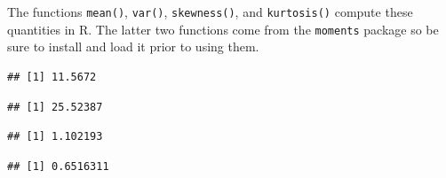 \documentclass[
]{book}
\newenvironment{Shaded}{\begin{snugshade}}{\end{snugshade}}
\newcommand{\DecValTok}[1]{\textcolor[rgb]{0.00,0.00,0.81}{#1}}
\newcommand{\DocumentationTok}[1]{\textcolor[rgb]{0.56,0.35,0.01}{\textbf{\textit{#1}}}}
\newcommand{\FunctionTok}[1]{\textcolor[rgb]{0.13,0.29,0.53}{\textbf{#1}}}
\newcommand{\NormalTok}[1]{#1}
\newcommand{\SpecialCharTok}[1]{\textcolor[rgb]{0.81,0.36,0.00}{\textbf{#1}}}
\begin{document}
The functions \texttt{mean()}, \texttt{var()}, \texttt{skewness()}, and \texttt{kurtosis()} compute these quantities in R. The latter two functions come from the \texttt{moments} package so be sure to install and load it prior to using them.

\begin{Shaded}
\end{Shaded}

\begin{verbatim}
## [1] 11.5672
\end{verbatim}

\begin{Shaded}
\end{Shaded}

\begin{verbatim}
## [1] 25.52387
\end{verbatim}

\begin{Shaded}
\end{Shaded}

\begin{verbatim}
## [1] 1.102193
\end{verbatim}

\begin{Shaded}
\end{Shaded}

\begin{verbatim}
## [1] 0.6516311
\end{verbatim}
\end{document}
